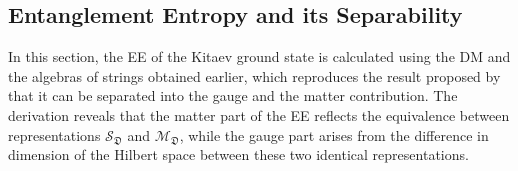 \subsection{Entanglement Entropy and its Separability}\label{sec:EE-calculation-even}

In this section, the EE of the Kitaev ground state is calculated using the DM and the algebras of strings obtained earlier, which reproduces the result proposed by~\cite{Yao-Qi_2010} that it can be separated into the gauge and the matter contribution. The derivation reveals that the matter part of the EE reflects the equivalence between representations $\mathcal{S}_\mathfrak{D}$ and $\mathcal{M}_\mathfrak{D}$, while the gauge part arises from the difference in dimension of the Hilbert space between these two identical representations. 



